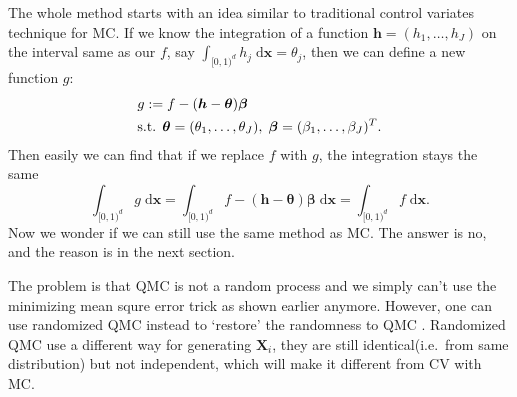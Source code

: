 

The whole method starts with an idea similar to traditional control variates technique for MC.
If we know the integration of a function $\boldsymbol{h}=(h_1,\dots,h_J)$ on the interval same as our $f$, say $\int_{[0,1)^d}h_j\; \textrm{d}\mathbf{x}=\theta_j$, then we can define a new function $g$:
\begin{align}\label{eq:defg}
    & g:=f-(\boldsymbol{h}-\boldsymbol{\theta})\boldsymbol{\beta}\\
    \notag
    &\text{s.t. }\boldsymbol{\theta}=(\theta_1,\dots,\theta_J),
    \;\boldsymbol{\beta}=(\beta_1,\dots,\beta_J)^T.
\end{align}
Then easily we can find that if we replace $f$ with $g$, the integration stays the same
\[
    \int_{[0,1)^d}g\;\textrm{d}\mathbf{x}
        =\int_{[0,1)^d}f-(\boldsymbol{h}-\boldsymbol{\theta})\boldsymbol{\beta}\;\textrm{d}\mathbf{x}
            =\int_{[0,1)^d}f\;\textrm{d}\mathbf{x}.
\]
Now we wonder if we can still use the same method as MC. The answer is no, and the reason is in the next section. 


The problem is that QMC is not a random process and we simply can't use the minimizing mean squre error trick as shown earlier anymore. However, one can use randomized QMC instead to `restore' the randomness to QMC \cite{owen2006warnock}. 
Randomized QMC use a different way for generating $\mathbf{X}_i$, they are still identical(i.e.\ from same distribution) but not independent, which will make it different from CV with MC.

